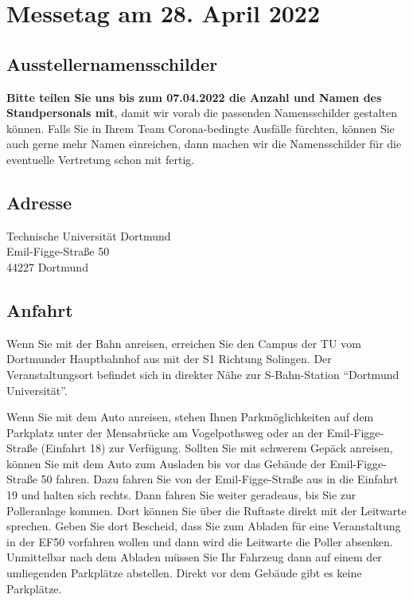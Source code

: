 \documentclass[
  paper=a4,
  fontsize=12pt,
  DIV=16,
  headheight=30pt,
  footheight=45pt,
  headinclude,
  parskip=half,
]{scrartcl}
\begin{document}
\section*{Messetag am 28. April 2022}

\subsection*{Ausstellernamensschilder}

\textbf{Bitte teilen Sie uns bis zum 07.04.2022 die Anzahl und Namen des Standpersonals mit}, damit wir vorab die passenden Namensschilder gestalten können.
Falls Sie in Ihrem Team Corona-bedingte Ausfälle fürchten, können Sie auch gerne mehr Namen einreichen, dann machen wir die Namensschilder für die eventuelle Vertretung schon mit fertig.

\subsection*{Adresse}

Technische Universität Dortmund\\
Emil-Figge-Straße 50\\
44227 Dortmund

\subsection*{Anfahrt}

Wenn Sie mit der Bahn anreisen, erreichen Sie den Campus der TU vom Dortmunder Hauptbahnhof aus mit der S1 Richtung Solingen.
Der Veranstaltungsort befindet sich in direkter Nähe zur S-Bahn-Station \enquote{Dortmund Universität}.

Wenn Sie mit dem Auto anreisen, stehen Ihnen Parkmöglichkeiten auf dem Parkplatz unter der Mensabrücke am Vogelpothsweg oder an der Emil-Figge-Straße (Einfahrt 18) zur Verfügung.
Sollten Sie mit schwerem Gepäck anreisen, können Sie mit dem Auto zum Ausladen bis vor das Gebäude der Emil-Figge-Straße 50 fahren.
Dazu fahren Sie von der Emil-Figge-Straße aus in die Einfahrt 19 und halten sich rechts.
Dann fahren Sie weiter geradeaus, bis Sie zur Polleranlage kommen.
Dort können Sie über die Ruftaste direkt mit der Leitwarte sprechen.
Geben Sie dort Bescheid, dass Sie zum Abladen für eine Veranstaltung in der EF50 vorfahren wollen und dann wird die Leitwarte die Poller absenken.
Unmittelbar nach dem Abladen müssen Sie Ihr Fahrzeug dann auf einem der umliegenden Parkplätze abstellen.
Direkt vor dem Gebäude gibt es keine Parkplätze.
\end{document}
